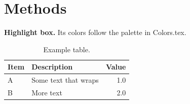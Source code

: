 \section{Methods}
\label{sec:paper1:methods}
\lipsum[3]

\begin{boxJ}
\textbf{Highlight box.} Its colors follow the palette in Colors.tex.
\end{boxJ}

\begin{table}[h]
    \centering
    \caption{Example table.}
    \label{tab:paper1:example}
    \begin{tabularx}{\linewidth}{lLR}
        \toprule
        Item & Description & Value \\
        \midrule
        A & Some text that wraps & 1.0 \\
        B & More text & 2.0 \\
        \bottomrule
    \end{tabularx}
\end{table}
